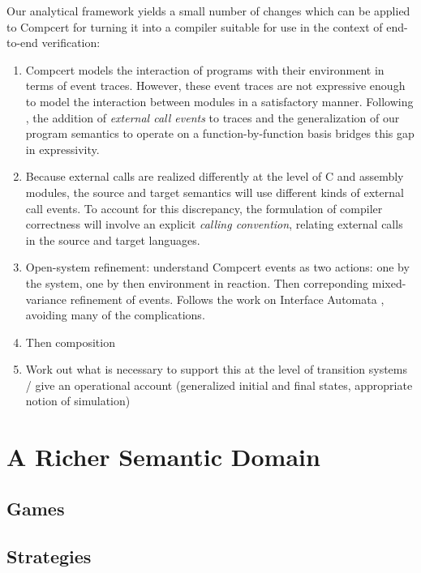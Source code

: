 \documentclass[sigplan,10pt,review,anonymous]{acmart}
\begin{document}
{ \color{gray}

Our analytical framework
yields a small number of changes
which can be applied to Compcert for
turning it into a compiler suitable for use
in the context of end-to-end verification:
\begin{enumerate}
\item Compcert models the interaction of programs
  with their environment in terms of event traces.
  However,
  these event traces are not expressive enough
  to model the interaction between modules in a satisfactory manner.
  Following \cite{cpp2015},
  the addition of \emph{external call events} to traces
  and the generalization of our program semantics
  to operate on a function-by-function basis
  bridges this gap in expressivity.
\item Because external calls are realized differently
  at the level of C and assembly modules,
  the source and target semantics
  will use different kinds of external call events.
  To account for this discrepancy,
  the formulation of compiler correctness
  will involve an explicit \emph{calling convention},
  relating external calls in the source and target languages.
\item 
  Open-system refinement: understand Compcert events
  as two actions: one by the system, one by then environment in reaction.
  Then correponding mixed-variance refinement of events.
  Follows the work on Interface Automata \cite{ia},
  avoiding many of the complications.
\item
  Then composition
\item
  Work out what is necessary to support this
  at the level of transition systems / give an operational account
  (generalized initial and final states,
  appropriate notion of simulation)
\end{enumerate}

}


\section{A Richer Semantic Domain} %

\subsection{Games}
\subsection{Strategies}
\end{document}

